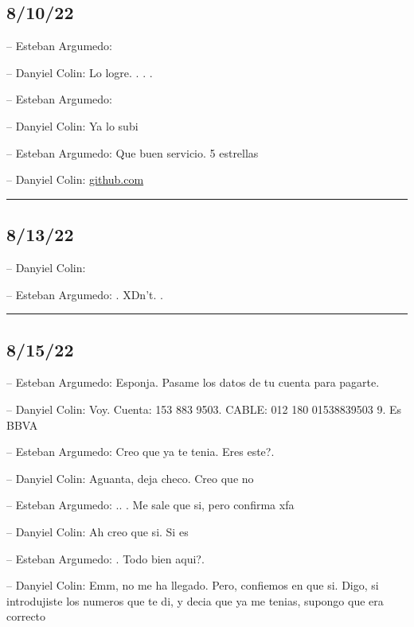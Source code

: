 \hypertarget{section-142}{%
\subsection{8/10/22}\label{section-142}}

-- Esteban Argumedo:

-- Danyiel Colin: Lo logre. . . .

-- Esteban Argumedo:

-- Danyiel Colin: Ya lo subi

-- Esteban Argumedo: Que buen servicio. 5 estrellas

-- Danyiel Colin:
\href{https://github.com/DanEscher98/Escritos/tree/main/DailyTechNotes}{github.com}

\begin{center}\rule{0.5\linewidth}{0.5pt}\end{center}

\hypertarget{section-143}{%
\subsection{8/13/22}\label{section-143}}

-- Danyiel Colin:

-- Esteban Argumedo: . XDn't. .

\begin{center}\rule{0.5\linewidth}{0.5pt}\end{center}

\hypertarget{section-144}{%
\subsection{8/15/22}\label{section-144}}

-- Esteban Argumedo: Esponja. Pasame los datos de tu cuenta para
pagarte.

-- Danyiel Colin: Voy. Cuenta: 153 883 9503. CABLE: 012 180 01538839503
9. Es BBVA

-- Esteban Argumedo: Creo que ya te tenia. Eres este?.

-- Danyiel Colin: Aguanta, deja checo. Creo que no

-- Esteban Argumedo: .. . Me sale que si, pero confirma xfa

-- Danyiel Colin: Ah creo que si. Si es

-- Esteban Argumedo: . Todo bien aqui?.

-- Danyiel Colin: Emm, no me ha llegado. Pero, confiemos en que si.
Digo, si introdujiste los numeros que te di, y decia que ya me tenias,
supongo que era correcto


